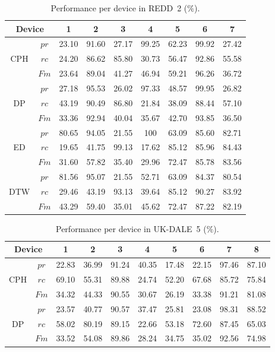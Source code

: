\begin{table}
\caption{Performance per device in REDD~2 ($\%$).}\label{table:SR10}
\begin{center}
\begin{tabular}{|c|c|c|c|c|c|c|c|c|}
\hline
\multicolumn{2}{|c|}{Device}& 1&2&3&4&5&6&7\\
\hline
\multirow{3}{*}{CPH} & $pr$ &23.10 &91.60 &27.17 &99.25 &62.23 &99.92 &27.42  \\
& $rc$ & 24.20& 86.62&85.80 &30.73 &56.47 &92.86 &55.58  \\
& $Fm$ & 23.64&89.04 &41.27 &46.94 &59.21 &96.26 &36.72  \\
\hline
\multirow{3}{*}{DP} & $pr$ & 27.18&95.53 &26.02 &97.33 &48.57 &99.95 &26.82 \\
& $rc$ & 43.19&90.49 &86.80 &21.84 &38.09 &88.44 &57.10   \\
& $Fm$ &33.36 &92.94 &40.04 &35.67 &42.70 &93.85 &36.50  \\
\hline
\multirow{3}{*}{ED} & $pr$ & 80.65 &94.05 &21.55 &100 & 63.09 &85.60 &82.71\\
& $rc$ &19.65 & 41.75 & 99.13 & 17.62 & 85.12 & 85.96 & 84.43   \\
& $Fm$ & 31.60 & 57.82 & 35.40 & 29.96 & 72.47 & 85.78 & 83.56  \\
\hline
\multirow{3}{*}{DTW} & $pr$ & 81.56& 95.07 &21.55 & 52.71& 63.09&84.37&80.54 \\
& $rc$ & 29.46&43.19 &93.13 &39.64 &85.12 &90.27 &83.92  \\
& $Fm$ &43.29 &59.40 &35.01 &45.62 &72.47 &87.22 &82.19  \\
\hline
\end{tabular}
\end{center}
\end{table}

\begin{table}
\caption{Performance per device in UK-DALE~5 ($\%$).}\label{table:SR11}
\begin{center}
\begin{tabular}{|c|c|c|c|c|c|c|c|c|c|}
\hline
\multicolumn{2}{|c|}{Device}& 1&2&3&4&5&6&7&8\\
\hline
\multirow{3}{*}{CPH} & $pr$ &22.83 &36.99 &91.24 &40.35 & 17.48 &22.15 &97.46 &87.10 \\
& $rc$ &69.10 &55.31 &89.88 &24.74 &52.20 &67.68 &85.72 &75.84  \\
& $Fm$ &34.32 &44.33 &90.55 &30.67 &26.19 &33.38 &91.21 &81.08 \\
\hline
\multirow{3}{*}{DP} & $pr$ &23.57 &40.77 &90.57 &37.47 &25.81 &23.08 &98.31 &88.52 \\
& $rc$ &58.02 &80.19 &89.15 &22.66 &53.18 &72.60 &87.45 &65.03  \\
& $Fm$ & 33.52&54.08 &89.86 &28.24 &34.75 &35.02 &92.56 &74.98 \\
\hline
\end{tabular}
\end{center}
\end{table}

